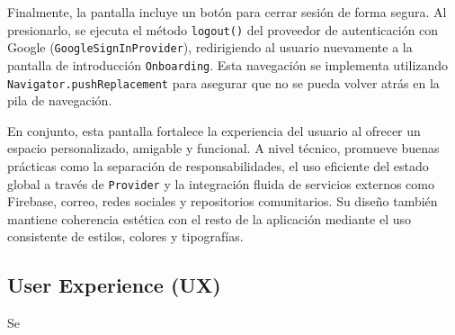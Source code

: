 Finalmente, la pantalla incluye un botón para cerrar sesión de forma segura. Al presionarlo, se ejecuta el método \texttt{logout()} del proveedor de autenticación con Google (\texttt{GoogleSignInProvider}), redirigiendo al usuario nuevamente a la pantalla de introducción \texttt{Onboarding}. Esta navegación se implementa utilizando \texttt{Navigator.pushReplacement} para asegurar que no se pueda volver atrás en la pila de navegación.

En conjunto, esta pantalla fortalece la experiencia del usuario al ofrecer un espacio personalizado, amigable y funcional. A nivel técnico, promueve buenas prácticas como la separación de responsabilidades, el uso eficiente del estado global a través de \texttt{Provider} y la integración fluida de servicios externos como Firebase, correo, redes sociales y repositorios comunitarios. Su diseño también mantiene coherencia estética con el resto de la aplicación mediante el uso consistente de estilos, colores y tipografías.






























































\subsection{User Experience (UX)}
Se 

